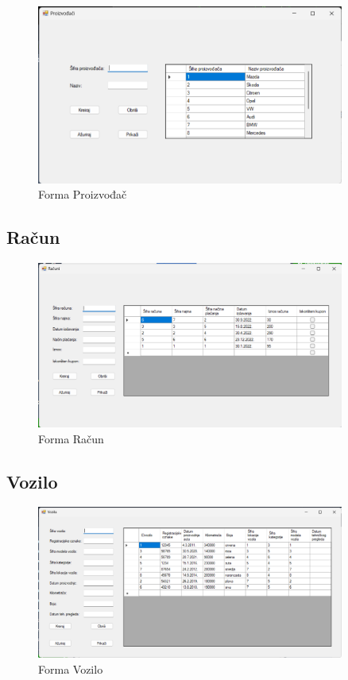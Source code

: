 \documentclass[]{foi}
\begin{document}
\begin{figure}[!ht]
    \centering
    \includegraphics[width=0.9\textwidth]{slike/proizvodac.png}
    \caption{Forma Proizvođač}
    \label{fig:proizvodac}
\end{figure}
\newpage

\subsection{Račun}

\begin{figure}[!ht]
    \centering
    \includegraphics[width=0.9\textwidth]{slike/racun.png}
    \caption{Forma Račun}
    \label{fig:racun}
\end{figure}

\subsection{Vozilo}

\begin{figure}[!ht]
    \centering
    \includegraphics[width=0.9\textwidth]{slike/vozilo.png}
    \caption{Forma Vozilo}
    \label{fig:vozilo}
\end{figure}
\end{document}
